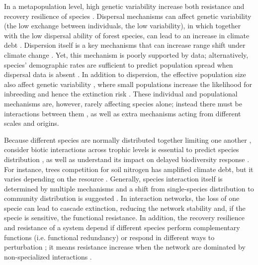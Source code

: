 In a metapopulation level, high genetic variability increase both resistance and recovery resilience of species \parencite{Hylander2013,Oliver2015}.
Dispersal mechanisms can affect genetic variability (the low exchange between individuals, the low variability), in which together with the low dispersal ability of forest species, can lead to an increase in climate debt \parencite{Hylander2013,Bertrand2016}.
Dispersion itself is a key mechanisms that can increase range shift under climate change \parencite{Gonzalez-Varo2017}. Yet, this mechanism is poorly supported by data; alternatively, species’ demographic rates are sufficient to predict population spread when dispersal data is absent \parencite{Hemrova2017}.
In addition to dispersion, the effective population size also affect genetic variability \parencite{Oliver2015}, where small populations increase the likelihood for inbreeding and hence the extinction risk \parencite{Nieminen2001}.
These individual and populational mechanisms are, however, rarely affecting species alone; instead there must be interactions between them \parencite{Hylander2013}, as well as extra mechanisms acting from different scales and origins.

Because different species are normally distributed together limiting one another \parencite{Clark2014a}, consider biotic interactions across trophic levels is essential to predict species distribution \parencite{VanderPutten2010}, as well as understand its impact on delayed biodiversity response \parencite{Essl2015}.
For instance, trees competition for soil nitrogen has amplified climate debt, but it varies depending on the resource \parencite{Bertrand2016}.
Generally, species interaction itself is determined by multiple mechanisms \parencite[for an overview]{Louthan2015} and a shift from single-species distribution to community distribution is suggested \parencite{Cazelles2016}.
In interaction networks, the loss of one specie can lead to cascade extinction, reducing the network stability \parencite{Dunne2002} and, if the specie is sensitive, the functional resistance.
In addition, the recovery resilience and resistance of a system depend if different species perform complementary functions (i.e. functional redundancy) or respond in different ways to perturbation \parencite{Winfree2009}; it means resistance increase when the network are dominated by non-specialized interactions \parencite{Oliver2015}.\\

